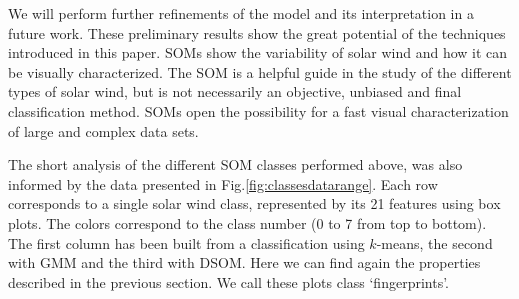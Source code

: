 \documentclass[utf8]{frontiersSCNS} %
\begin{document}
%
%
%

We will perform further refinements of the model and its interpretation in a future work. These preliminary results show the great potential of the techniques introduced in this paper. SOMs show the variability of solar wind and how it can be visually characterized. The SOM is a helpful guide in the study of the different types of solar wind, but is not necessarily an objective, unbiased and final classification method. SOMs open the possibility for a fast visual characterization of large and complex data sets.

The short analysis of the different SOM classes performed above, was also informed by the data presented in Fig.\ref{fig:classesdatarange}. Each row corresponds to a single solar wind class, represented by its 21 features using box plots. The colors correspond to the class number (0 to 7 from top to bottom). The first column has been built from a classification using $k$-means, the second with GMM and the third with DSOM. Here we can find again the properties described in the previous section. We call these plots class `fingerprints'.
\end{document}
